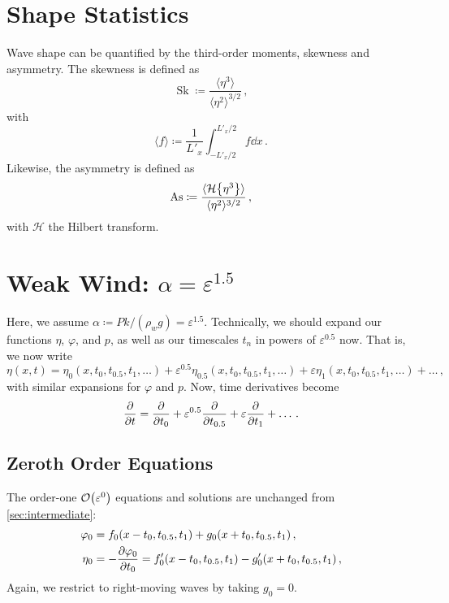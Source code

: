 \documentclass{jfm}
\let\Oldsection\section
\renewcommand{\section}{\FloatBarrier\Oldsection}
\let\Oldsubsection\subsection
\renewcommand{\subsection}{\FloatBarrier\Oldsubsection}
\DeclareMathOperator{\Sk}{Sk}
\DeclareMathOperator{\As}{As}
\newcommand{\hilbert}{\mathcal{H}}
\renewcommand*{\epsilon}{\varepsilon}
\begin{document}
\section{Shape Statistics}
Wave shape can be quantified by the third-order moments, skewness and
asymmetry.
The skewness is defined as
\begin{equation}
  \Sk \coloneqq \frac{\langle \eta^3 \rangle}{\langle \eta^2
  \rangle^{3/2}} \,,
\end{equation}
with
\begin{equation}
  \langle f \rangle \coloneqq \frac{1}{L'_x} \int_{-L'_x/2}^{L'_x/2} f
  \dd{x} \,.
\end{equation}
Likewise, the asymmetry is defined as
\begin{equation}
  \As \coloneqq \frac{\langle \hilbert \Bqty{\eta^3} \rangle}{\langle
    \eta^2 \rangle^{3/2}} \,,
\end{equation}
with $\hilbert$ the Hilbert transform.

\section{\texorpdfstring{Weak Wind: $\alpha = \epsilon^{1.5}$}{Weak
Wind} \label{sec:weak}}
Here, we assume $\alpha \coloneqq P k/(\rho_w g) = \epsilon^{1.5}$.
Technically, we should expand our functions $\eta$, $\varphi$, and $p$,
as well as our timescales $t_n$ in powers of $\epsilon^{0.5}$ now.
That is, we now write
\begin{equation}
  \eta(x,t) = \eta_0(x,t_0,t_{0.5},t_1,\ldots) + \epsilon^{0.5}
  \eta_{0.5}(x,t_0,t_{0.5},t_1,\ldots) + \epsilon
  \eta_1(x,t_0,t_{0.5},t_1,\ldots) + \ldots \,,
\end{equation}
with similar expansions for $\varphi$ and $p$.
Now, time derivatives become
\begin{equation}
  \pdv{t} = \pdv{t_0} + \epsilon^{0.5} \pdv{t_{0.5}} + \epsilon
  \pdv{t_1} + \ldots \,.
\end{equation}

\subsection{Zeroth Order Equations}
The order-one $\order{\epsilon^0}$ equations and solutions are unchanged
from \cref{sec:intermediate}:
\begin{align}
  \varphi_0 &= f_0(x-t_0,t_{0.5},t_1) + g_0(x+t_0,t_{0.5},t_1) \,, \\
  \eta_0 &= - \pdv{\varphi_0}{t_0} = f_0'(x-t_0,t_{0.5},t_1) -
    g_0'(x+t_0,t_{0.5},t_1) \,,
\end{align}
Again, we restrict to right-moving waves by taking $g_0=0$.
\end{document}
